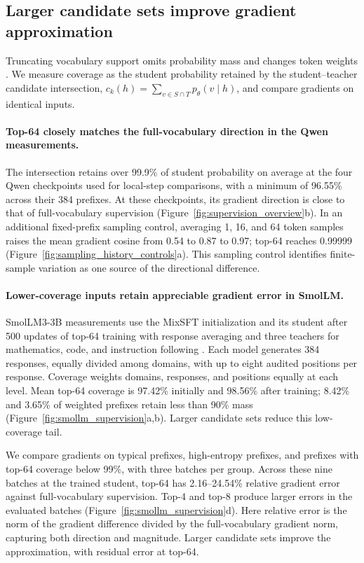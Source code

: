 \subsection{Larger candidate sets improve gradient approximation}
\label{sec:coverage_gradient}

Truncating vocabulary support omits probability mass and changes token weights \citep{anshumann2025sparse,huang2026tailaware}. We measure coverage as the student probability retained by the student--teacher candidate intersection, $c_k(h)=\sum_{v\in S\cap T}p_\theta(v\mid h)$, and compare gradients on identical inputs.

\paragraph{Top-64 closely matches the full-vocabulary direction in the Qwen measurements.}
The intersection retains over 99.9\% of student probability on average at the four Qwen checkpoints used for local-step comparisons, with a minimum of 96.55\% across their 384 prefixes. At these checkpoints, its gradient direction is close to that of full-vocabulary supervision (Figure~\ref{fig:supervision_overview}b). In an additional fixed-prefix sampling control, averaging 1, 16, and 64 token samples raises the mean gradient cosine from 0.54 to 0.87 to 0.97; top-64 reaches 0.99999 (Figure~\ref{fig:sampling_history_controls}a). This sampling control identifies finite-sample variation as one source of the directional difference.

\paragraph{Lower-coverage inputs retain appreciable gradient error in SmolLM.}
SmolLM3-3B measurements use the MixSFT initialization and its student after 500 updates of top-64 training with response averaging and three teachers for mathematics, code, and instruction following \citep{gao2026openmopddiagnosingfixingcapability}. Each model generates 384 responses, equally divided among domains, with up to eight audited positions per response. Coverage weights domains, responses, and positions equally at each level. Mean top-64 coverage is 97.42\% initially and 98.56\% after training; 8.42\% and 3.65\% of weighted prefixes retain less than 90\% mass (Figure~\ref{fig:smollm_supervision}a,b). Larger candidate sets reduce this low-coverage tail.

We compare gradients on typical prefixes, high-entropy prefixes, and prefixes with top-64 coverage below 99\%, with three batches per group. Across these nine batches at the trained student, top-64 has 2.16--24.54\% relative gradient error against full-vocabulary supervision. Top-4 and top-8 produce larger errors in the evaluated batches (Figure~\ref{fig:smollm_supervision}d). Here relative error is the norm of the gradient difference divided by the full-vocabulary gradient norm, capturing both direction and magnitude. Larger candidate sets improve the approximation, with residual error at top-64.


